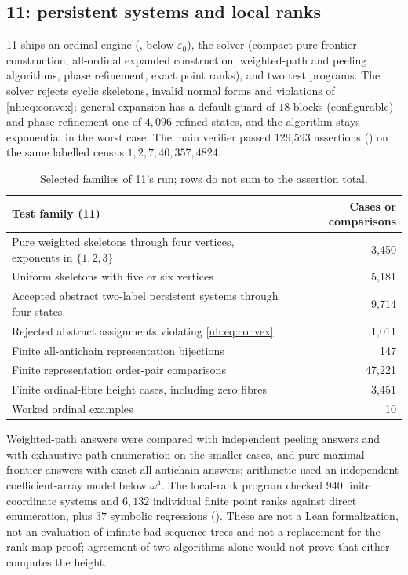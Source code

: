 \documentclass[11pt,a4paper]{article}
\theoremstyle{definition}
\theoremstyle{remark}
\newcommand{\eps}{\varepsilon_0}
\begin{document}
\subsection{11: persistent systems and local ranks}

11 ships an ordinal engine (, below $\eps$),
the solver  (compact pure-frontier
construction, all-ordinal expanded construction, weighted-path and peeling
algorithms, phase refinement, exact point ranks), and two test programs. The
solver rejects cyclic skeletons, invalid normal forms and violations of
\eqref{nh:eq:convex}; general expansion has a default guard of $18$ blocks
(configurable) and phase refinement one of $4{,}096$ refined states, and the
algorithm stays exponential in the worst case. The main verifier passed
129{,}593 assertions () on the same
labelled census $1,2,7,40,357,4824$.

\begin{table}[htbp]
\centering\small
\begin{tabularx}{\linewidth}{@{}Xr@{}}
\toprule
Test family (11) & Cases or comparisons\\
\midrule
Pure weighted skeletons through four vertices, exponents in $\{1,2,3\}$ & 3,450\\
Uniform skeletons with five or six vertices & 5,181\\
Accepted abstract two-label persistent systems through four states & 9,714\\
Rejected abstract assignments violating \eqref{nh:eq:convex} & 1,011\\
Finite all-antichain representation bijections & 147\\
Finite representation order-pair comparisons & 47,221\\
Finite ordinal-fibre height cases, including zero fibres & 3,451\\
Worked ordinal examples & 10\\
\bottomrule
\end{tabularx}
\caption{Selected families of 11's run; rows do not sum to the assertion total.}
\label{nh:tab:peelverify}
\end{table}

Weighted-path answers were compared with independent peeling answers and with
exhaustive path enumeration on the smaller cases, and pure maximal-frontier
answers with exact all-antichain answers; arithmetic used an independent
coefficient-array model below $\omega^4$. The local-rank program checked $940$
finite coordinate systems and $6{,}132$ individual finite point ranks against
direct enumeration, plus $37$ symbolic regressions
(). These are not a Lean
formalization, not an evaluation of infinite bad-sequence trees and not a
replacement for the rank-map proof; agreement of two algorithms alone would not
prove that either computes the height.
\end{document}
